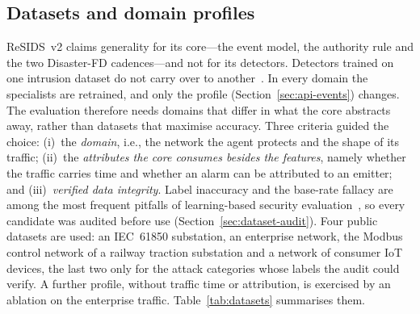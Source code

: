 
\subsection{Datasets and domain profiles}
\label{sec:datasets}

ReSIDS~v2 claims generality for its core---the event model, the authority rule and the two
Disaster-FD cadences---and not for its detectors.
Detectors trained on one intrusion dataset do not carry over to
another~\cite{dhooge2020interdataset}. In every domain the specialists are retrained,
and only the profile (Section~\ref{sec:api-events}) changes. The evaluation therefore
needs domains that differ in what the core abstracts away, rather than datasets that
maximise accuracy. Three criteria guided the choice:
(i)~the \emph{domain}, i.e., the network the agent protects and the shape of its traffic;
(ii)~the \emph{attributes the core consumes besides the features}, namely whether the
traffic carries time and whether an alarm can be attributed to an emitter; and
(iii)~\emph{verified data integrity}. Label inaccuracy and the base-rate fallacy are
among the most frequent pitfalls of learning-based security
evaluation~\cite{axelsson2000baserate,sommer2010outside,arp2022dos}, so every candidate
was audited before use (Section~\ref{sec:dataset-audit}). Four public datasets are used:
an IEC~61850 substation, an enterprise network, the Modbus control network of a railway
traction substation and a network of consumer IoT devices, the last two only for the
attack categories whose labels the audit could verify. A further profile, without traffic
time or attribution, is exercised by an ablation on the enterprise traffic.
Table~\ref{tab:datasets} summarises them.

